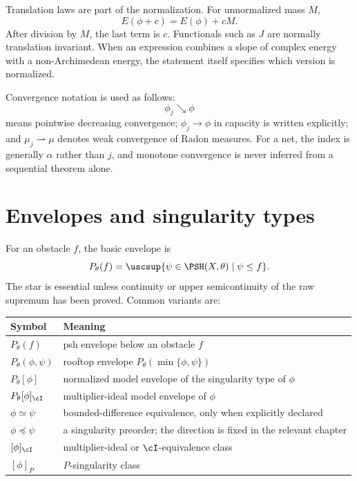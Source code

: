 Translation laws are part of the normalization.  For unnormalized mass
\(M\),
\[
 E(\phi+c)=E(\phi)+cM.
\]
After division by \(M\), the last term is \(c\).  Functionals such as \(J\)
are normally translation invariant.  When an expression combines a slope
of complex energy with a non-Archimedean energy, the statement itself
specifies which version is normalized.

Convergence notation is used as follows:
\[
 \phi_j\searrow\phi
\]
means pointwise decreasing convergence;
\(\phi_j\to\phi\) in capacity is written explicitly; and
\(\mu_j\rightharpoonup\mu\) denotes weak convergence of Radon measures.
For a net, the index is generally \(\alpha\) rather than \(j\), and
monotone convergence is never inferred from a sequential theorem alone.

\section{Envelopes and singularity types}
\label{sec:appK-envelopes}


For an obstacle \(f\), the basic envelope is
\[
 P_\theta(f)
   =\uscsup\{\psi\in\PSH(X,\theta)\mid \psi\leq f\}.
\]
The star is essential unless continuity or upper semicontinuity of the raw
supremum has been proved.  Common variants are:

\begin{center}
\begin{tabular}{@{}p{}p{}@{}}
\toprule
Symbol & Meaning \\
\midrule
\(P_\theta(f)\)
  & psh envelope below an obstacle \(f\) \\
\(P_\theta(\phi,\psi)\)
  & rooftop envelope \(P_\theta(\min\{\phi,\psi\})\) \\
\(P_\theta[\phi]\)
  & normalized model envelope of the singularity type of \(\phi\) \\
\(P_\theta[\phi]_{\cI}\)
  & multiplier-ideal model envelope of \(\phi\) \\
\(\phi\simeq\psi\)
  & bounded-difference equivalence, only when explicitly declared \\
\(\phi\preceq\psi\)
  & a singularity preorder; the direction is fixed in the relevant chapter \\
\([\phi]_{\cI}\)
  & multiplier-ideal or \(\cI\)-equivalence class \\
\([\phi]_P\)
  & \(P\)-singularity class \\
\bottomrule
\end{tabular}
\end{center}

